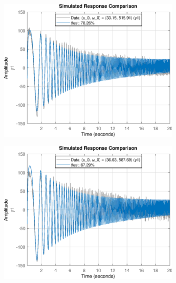 \begin{figure}[H]
    \begin{minipage}{0.32\textwidth}
       \begin{figure}[H]
            \includegraphics[width = \textwidth]{./figs/small_perturbation/time_Compare_1400.eps}
       \end{figure}
    \end{minipage}
    \begin{minipage}{0.32\textwidth}
       \begin{figure}[H]
            \includegraphics[width = \textwidth]{./figs/small_perturbation/time_Compare_1450.eps}

\end{figure}
\end{minipage}
\end{figure}
